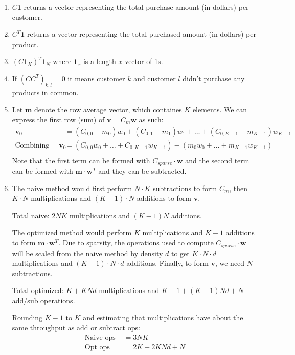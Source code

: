 \documentclass[11pt]{article}
\begin{document}
\begin{solution}
\begin{enumerate}
    \item $C \mathbf{1}$ returns a vector representing the total purchase amount (in dollars) per customer.
    \item $C^T \mathbf{1}$ returns a vector representing the total purchased amount (in dollars) per product.
    \item $(C \mathbf{1}_K)^T \mathbf{1}_N$ where $\mathbf{1}_x$ is a length $x$ vector of 1s.
    \item If $(C C^T)_{k,l} = 0$ it means customer $k$ and customer $l$ didn't purchase any products in common.
    \item Let $\mathbf{m}$ denote the row average vector, which containes $K$ elements. We can express the first row (sum) of $\mathbf{v} = C_m \mathbf{w}$ as such:
        \begin{align*}
            \mathbf{v}_0 &= (C_{0,0} - m_0) w_0 + (C_{0,1} - m_1) w_1 + \dots + (C_{0,K-1} - m_{K-1}) w_{K-1} \\
            \text{Combining terms: } \mathbf{v}_0 &= (C_{0,0}w_0 + \dots + C_{0,K-1}w_{K-1}) - (m_0 w_0 + \dots + m_{K-1} w_{K-1}) \\
        \end{align*}
        Note that the first term can be formed with $C_{sparse} \cdot \mathbf{w}$ and the second term can be formed with $\mathbf{m} \cdot \mathbf{w}^T$ and they can be subtracted.
    \item The naive method would first perform $N \cdot K$ subtractions to form $C_m$, then $K \cdot N$ multiplications and $(K-1) \cdot N$ additions to form $\mathbf{v}$.

        Total naive: $2 N K$ multiplications and $(K-1) N$ additions.

        The optimized method would perform $K$ multiplications and $K-1$ additions to form $\mathbf{m} \cdot \mathbf{w}^T$. Due to sparsity, the operations used to compute $C_{sparse} \cdot \mathbf{w}$ will be scaled from the naive method by density $d$ to get $K \cdot N \cdot d$ multiplications and $(K-1) \cdot N \cdot d$ additions. Finally, to form $\mathbf{v}$, we need $N$ subtractions.

        Total optimized: $K + KNd$ multiplications and $K-1 + (K-1) N d + N$ add/sub operations.

        Rounding $K-1$ to $K$ and estimating that multiplications have about the same throughput as add or subtract ops:
        \begin{align*}
            \text{Naive ops } &= 3NK \\
            \text{Opt ops } &= 2K + 2KNd + N
        \end{align*}


\end{enumerate}
\end{solution}
\end{document}
